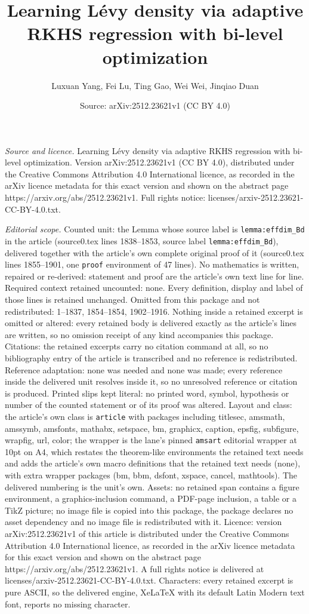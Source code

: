 \documentclass[10pt,a4paper]{amsart}
\title[Learning L\'evy density via adaptive RKHS regression with bi]{Learning L\'evy density via adaptive RKHS regression with bi-level optimization}
\author{Luxuan Yang, Fei Lu, Ting Gao, Wei Wei, Jinqiao Duan}
\date{Source: arXiv:2512.23621v1 (CC BY 4.0)}
\begin{document}
\maketitle

\noindent\emph{Source and licence.} Learning L\'evy density via adaptive RKHS regression with bi-level optimization. Version arXiv:2512.23621v1 (CC BY 4.0), distributed under the Creative Commons Attribution 4.0 International licence, as recorded in the arXiv licence metadata for this exact version and shown on the abstract page https://arxiv.org/abs/2512.23621v1. Full rights notice: licenses/arxiv-2512.23621-CC-BY-4.0.txt.\par\smallskip

\noindent\textit{Editorial scope.} Counted unit: the Lemma whose source label is \texttt{lemma:effdim\_Bd} in the article (source0.tex lines 1838--1853, source label \texttt{lemma:effdim\_Bd}), delivered together with the article's own complete original proof of it (source0.tex lines 1855--1901, one \texttt{proof} environment of 47 lines). No mathematics is written, repaired or re-derived: statement and proof are the article's own text line for line. Required context retained uncounted: none. Every definition, display and label of those lines is retained unchanged. Omitted from this package and not redistributed: 1--1837, 1854--1854, 1902--1916. Nothing inside a retained excerpt is omitted or altered: every retained body is delivered exactly as the article's lines are written, so no omission receipt of any kind accompanies this package. Citations: the retained excerpts carry no citation command at all, so no bibliography entry of the article is transcribed and no reference is redistributed. Reference adaptation: none was needed and none was made; every reference inside the delivered unit resolves inside it, so no unresolved reference or citation is produced. Printed slips kept literal: no printed word, symbol, hypothesis or number of the counted statement or of its proof was altered. Layout and class: the article's own class is \texttt{article} with packages including titlesec, amsmath, amssymb, amsfonts, mathabx, setspace, bm, graphicx, caption, epsfig, subfigure, wrapfig, url, color; the wrapper is the lane's pinned \texttt{amsart} editorial wrapper at 10pt on A4, which restates the theorem-like environments the retained text needs and adds the article's own macro definitions that the retained text needs (none), with extra wrapper packages (bm, bbm, dsfont, xspace, cancel, mathtools). The delivered numbering is the unit's own. Assets: no retained span contains a figure environment, a graphics-inclusion command, a PDF-page inclusion, a table or a TikZ picture; no image file is copied into this package, the package declares no asset dependency and no image file is redistributed with it. Licence: version arXiv:2512.23621v1 of this article is distributed under the Creative Commons Attribution 4.0 International licence, as recorded in the arXiv licence metadata for this exact version and shown on the abstract page https://arxiv.org/abs/2512.23621v1. A full rights notice is delivered at licenses/arxiv-2512.23621-CC-BY-4.0.txt. Characters: every retained excerpt is pure ASCII, so the delivered engine, XeLaTeX with its default Latin Modern text font, reports no missing character.
\end{document}
